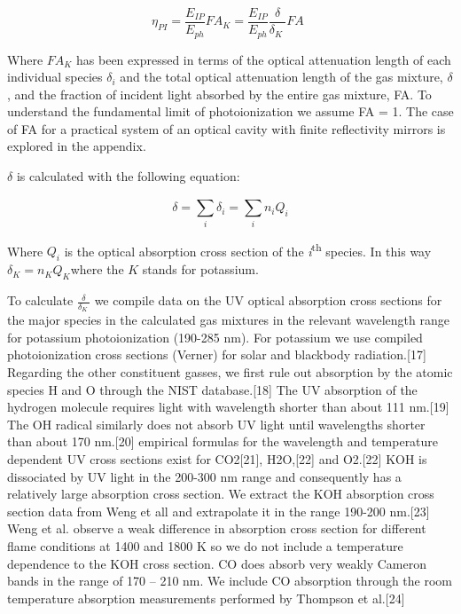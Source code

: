 \begin{equation}
\eta_{PI} = \frac{E_{IP}}{E_{ph}}FA_{K} = \frac{E_{IP}}{E_{ph}}\frac{\delta}{\delta_{K}\ }FA\ \ 
\end{equation}

Where \(FA_{K}\) has been expressed in terms of the optical attenuation length of each individual species \(\delta_{i}\) and the total optical attenuation length of the gas mixture, \(\delta\), and the fraction of incident light absorbed by the entire gas mixture, FA. To understand the fundamental limit of photoionization we assume FA = 1. The case of FA for a practical system of an optical cavity with finite reflectivity mirrors is explored in the appendix.

\(\delta\) is calculated with the following equation:

\begin{equation}
\delta = \sum_{i}^{}\delta_{i} = \sum_{i}^{}{n_{i}Q_{i}}
\end{equation}

Where \(Q_{i}\) is the optical absorption cross section of the \emph{i}\textsuperscript{th} species. In this way \(\delta_{K} = n_{K}Q_{K}\)where the \(K\) stands for potassium.

To calculate \(\frac{\delta}{\delta_{K}\ }\) we compile data on the UV optical absorption cross sections for the major species in the calculated gas mixtures in the relevant wavelength range for potassium photoionization (190-285 nm). For potassium we use compiled photoionization cross sections (Verner) for solar and blackbody radiation.{[}17{]} Regarding the other constituent gasses, we first rule out absorption by the atomic species H and O through the NIST database.{[}18{]} The UV absorption of the hydrogen molecule requires light with wavelength shorter than about 111 nm.{[}19{]} The OH radical similarly does not absorb UV light until wavelengths shorter than about 170 nm.{[}20{]} empirical formulas for the wavelength and temperature dependent UV cross sections exist for CO2{[}21{]}, H2O,{[}22{]} and O2.{[}22{]} KOH is dissociated by UV light in the 200-300 nm range and consequently has a relatively large absorption cross section. We extract the KOH absorption cross section data from Weng et all and extrapolate it in the range 190-200 nm.{[}23{]} Weng et al. observe a weak difference in absorption cross section for different flame conditions at 1400 and 1800 K so we do not include a temperature dependence to the KOH cross section. CO does absorb very weakly Cameron bands in the range of 170 -- 210 nm. We include CO absorption through the room temperature absorption measurements performed by Thompson et al.{[}24{]}

